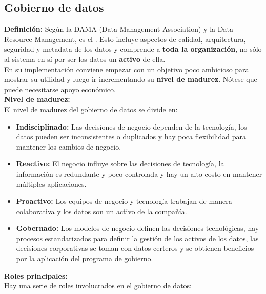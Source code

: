 \subsection*{Gobierno de datos}
\textbf{Definición:} Según la DAMA (Data Management Association) y la Data Resource Management, es el . Esto incluye aspectos de calidad, arquitectura, seguridad y metadata de los datos y comprende a \textbf{toda la organización}, no sólo al sistema en sí por ser los datos un \textbf{activo} de ella. \\
En su implementación conviene empezar con un objetivo poco ambicioso para mostrar su utilidad y luego ir incrementando su \textbf{nivel de madurez}. Nótese que puede necesitarse apoyo económico. \\
\textbf{Nivel de madurez:} \\
El nivel de madurez del gobierno de datos se divide en:
\begin{itemize}
    \item \textbf{Indisciplinado:} Las decisiones de negocio dependen de la tecnología, los datos pueden ser inconsistentes o duplicados y hay poca flexibilidad para mantener los cambios de negocio.
    \item \textbf{Reactivo:} El negocio influye sobre las decisiones de tecnología, la información es redundante y poco controlada y hay un alto costo en mantener múltiples aplicaciones.
    \item \textbf{Proactivo:} Los equipos de negocio y tecnología trabajan de manera colaborativa y los datos son un activo de la compañía.
    \item \textbf{Gobernado:} Los modelos de negocio definen las decisiones tecnológicas, hay procesos estandarizados para definir la gestión de los activos de los datos, las decisiones corporativas se toman con datos certeros y se obtienen beneficios por la aplicación del programa de gobierno.
\end{itemize}
\textbf{Roles principales:} \\
Hay una serie de roles involucrados en el gobierno de datos:
